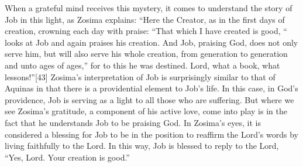 When a grateful mind receives this mystery, it comes to understand the story of Job in this light, as Zosima explains: “Here the Creator, as in the first days of creation, crowning each day with praise: “That which I have created is good, “ looks at Job and again praises his creation. And Job, praising God, does not only serve him, but will also serve his whole creation, from generation to generation and unto ages of ages,” for to this he was destined. Lord, what a book, what lessons!”[43] Zosima’s interpretation of Job is surprisingly similar to that of Aquinas in that there is a providential element to Job’s life. In this case, in God’s providence, Job is serving as a light to all those who are suffering. But where we see Zosima’s gratitude, a component of his active love, come into play is in the fact that he understands Job to be praising God. In Zosima’s eyes, it is considered a blessing for Job to be in the position to reaffirm the Lord’s words by living faithfully to the Lord. In this way, Job is blessed to reply to the Lord, “Yes, Lord. Your creation is good.”

